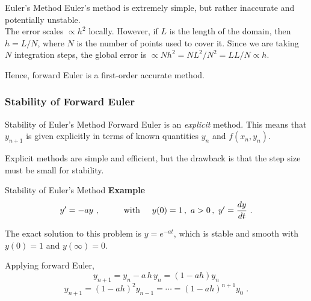 \documentclass[11pt]{beamer}
\begin{document}
\begin{frame}[fragile]{Euler's Method}
Euler's method is extremely simple, but rather inaccurate and potentially unstable.\\

The error scales $\propto h^2$ locally. However, if $L$ is
the length of the domain, then $h = L / N$, where $N$ is the number of points
used to cover it. Since we are taking $N$ integration steps, the global
error is $\propto N h^2 = N L^2 / N^2 = L L/N \propto h$. \\
\bigskip

Hence, forward
Euler is a first-order accurate method.
\end{frame}

\subsubsection{Stability of Forward Euler}
\begin{frame}[fragile]{Stability of Euler's Method}
Forward Euler is an \emph{explicit} method. This means that 
$y_{n+1}$ is given explicitly in terms of known quantities
$y_n$ and $f(x_n,y_n)$.
\bigskip
 
Explicit methods are simple and efficient, but the drawback is that
the step size must be small for stability.
\end{frame}

\begin{frame}[fragile]{Stability of Euler's Method}
 \textbf{Example}
\begin{equation}
y' = -a y\,\,, \hspace{1cm}\text{with}\hspace{0.5cm} 
y(0) = 1\,,\,\, a > 0\,,\,\, y' = \frac{dy}{dt}\,\,.
\end{equation}

The exact solution to this problem is $y = e^{-at}$,
which is stable and  smooth with $y(0) = 1$ and
$y(\infty) = 0$.

Applying forward Euler,
\begin{equation}
y_{n+1} = y_n - a\, h\, y_n = (1-ah) y_{n} 
\end{equation}
\begin{equation}
y_{n+1}  = (1-ah)^2 y_{n-1} = \cdots = (1-ah)^{n+1} y_0\,\,.
\end{equation}
\end{frame}
\end{document}
